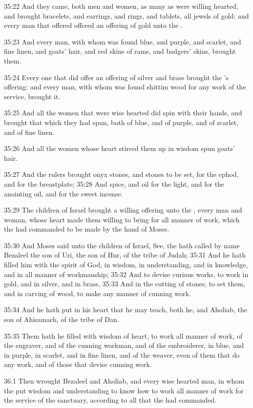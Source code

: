 35:22 And they came, both men and women, as many as were willing
hearted, and brought bracelets, and earrings, and rings, and tablets,
all jewels of gold: and every man that offered offered an offering of
gold unto the \LORD.

35:23 And every man, with whom was found blue, and purple, and
scarlet, and fine linen, and goats' hair, and red skins of rams, and
badgers' skins, brought them.

35:24 Every one that did offer an offering of silver and brass brought
the \LORD's offering: and every man, with whom was found shittim wood
for any work of the service, brought it.

35:25 And all the women that were wise hearted did spin with their
hands, and brought that which they had spun, both of blue, and of
purple, and of scarlet, and of fine linen.

35:26 And all the women whose heart stirred them up in wisdom spun
goats' hair.

35:27 And the rulers brought onyx stones, and stones to be set, for
the ephod, and for the breastplate; 35:28 And spice, and oil for the
light, and for the anointing oil, and for the sweet incense.

35:29 The children of Israel brought a willing offering unto the \LORD,
every man and woman, whose heart made them willing to bring for all
manner of work, which the \LORD had commanded to be made by the hand of
Moses.

35:30 And Moses said unto the children of Israel, See, the \LORD hath
called by name Bezaleel the son of Uri, the son of Hur, of the tribe
of Judah; 35:31 And he hath filled him with the spirit of God, in
wisdom, in understanding, and in knowledge, and in all manner of
workmanship; 35:32 And to devise curious works, to work in gold, and
in silver, and in brass, 35:33 And in the cutting of stones, to set
them, and in carving of wood, to make any manner of cunning work.

35:34 And he hath put in his heart that he may teach, both he, and
Aholiab, the son of Ahisamach, of the tribe of Dan.

35:35 Them hath he filled with wisdom of heart, to work all manner of
work, of the engraver, and of the cunning workman, and of the
embroiderer, in blue, and in purple, in scarlet, and in fine linen,
and of the weaver, even of them that do any work, and of those that
devise cunning work.

36:1 Then wrought Bezaleel and Aholiab, and every wise hearted man, in
whom the \LORD put wisdom and understanding to know how to work all
manner of work for the service of the sanctuary, according to all that
the \LORD had commanded.

